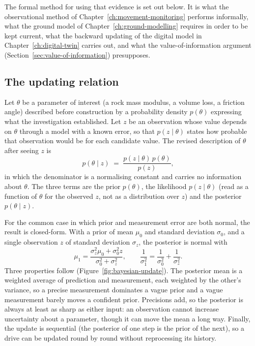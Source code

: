 The formal method for using that evidence is set out below. It is what the observational method of
Chapter~\ref{ch:movement-monitoring} performs informally, what the ground
model of Chapter~\ref{ch:ground-modelling} requires in order to be kept
current, what the backward updating of the digital model in
Chapter~\ref{ch:digital-twin} carries out, and what the value-of-information argument
(Section~\ref{sec:value-of-information}) presupposes.

\subsection{The updating relation}
\label{sec:updating-relation}

Let $\theta$ be a parameter of interest (a rock mass modulus, a volume
loss, a friction angle) described before construction by a probability
density $p(\theta)$ expressing what the investigation established. Let $z$ be
an observation whose value depends on $\theta$ through a model with a known
error, so that $p(z \mid \theta)$ states how probable that observation would
be for each candidate value. The revised description of $\theta$ after seeing
$z$ is
\[
p(\theta \mid z) \;=\; \frac{p(z \mid \theta)\, p(\theta)}{p(z)} ,
\]
in which the denominator is a normalising constant and carries no information
about $\theta$. The three terms are the prior
$p(\theta)$, the likelihood $p(z \mid \theta)$ (read as a function of
$\theta$ for the observed $z$, not as a distribution over $z$) and
the posterior $p(\theta \mid z)$.

For the common case in which prior and measurement error are both normal, the
result is closed-form. With a prior of mean $\mu_0$ and
standard deviation $\sigma_0$, and a single observation $z$ of standard
deviation $\sigma_z$, the posterior is normal with
\[
\mu_1 = \frac{\sigma_z^2 \mu_0 + \sigma_0^2 z}{\sigma_0^2 + \sigma_z^2},
\qquad
\frac{1}{\sigma_1^2} = \frac{1}{\sigma_0^2} + \frac{1}{\sigma_z^2} .
\]
Three properties follow
(Figure~\ref{fig:bayesian-update}). The
posterior mean is a weighted average of prediction and measurement, each
weighted by the other's variance, so a precise measurement dominates a vague
prior and a vague measurement barely moves a confident prior. Precisions add,
so the posterior is always at least as sharp as either input: an observation
cannot increase uncertainty about a parameter, though it can move the mean a
long way. Finally, the update is sequential (the posterior of one step is the
prior of the next), so a drive can be updated round by round without reprocessing its
history.

